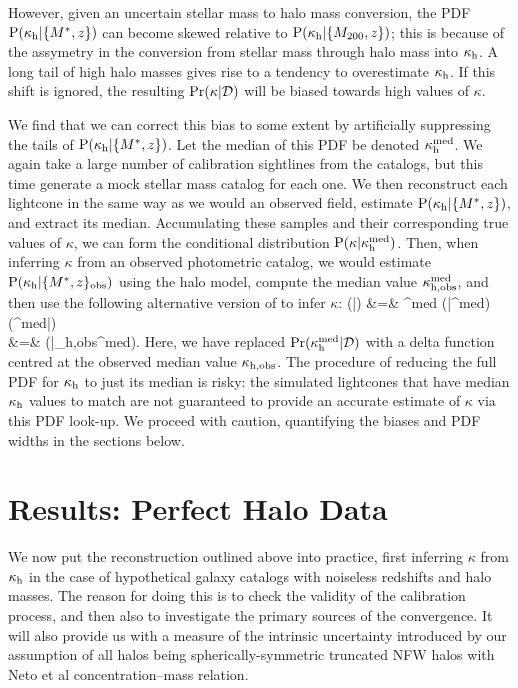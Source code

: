 \documentclass[useAMS,usenatbib]{mn2e}
\begin{document}
However, given an uncertain stellar mass to halo mass conversion, the PDF
${\rm P}(\kappa_{\rm h}|\{M^{*},z\})$ can become skewed relative to
${\rm P}(\kappa_{\rm h}|\{M_{200},z\})$; this is because of the assymetry in the
conversion from stellar mass through halo mass into $\kappa_{\rm h}$. A long tail of
high halo masses gives rise to a tendency to overestimate $\kappa_{\rm h}$.
If this shift is ignored, the resulting $\Pr(\kappa|{\mathcal{D}})$ will be 
biased towards high values of $\kappa$. 

We find that we can correct this bias to some extent by artificially 
suppressing the tails of ${\rm P}(\kappa_{\rm h}|\{M^{*},z\})$. Let the median of
this PDF be denoted $\kappa_{\rm h}^{\rm med}$. We again take a large number of
calibration sightlines from the \MS catalogs, but this time generate a mock
stellar mass catalog for each one. We then reconstruct each lightcone in the
same way as we would an observed field,
estimate ${\rm P}(\kappa_{\rm h}|\{M^{*},z\})$, and extract its median. Accumulating
these samples and their corresponding true values of $\kappa$, we can form the 
conditional distribution ${\rm P}(\kappa|\kappa_{\rm h}^{\rm med})$. 
Then, when inferring $\kappa$ from an observed photometric catalog, we would
estimate ${\rm P}(\kappa_{\rm h}|\{M^{*},z\}_{\rm obs})$ 
using the halo model, compute the median value 
$\kappa_{\rm h,obs}^{\rm med}$, and then use the following alternative
version of 
 to infer $\kappa$: 
\bea
\Pr(\kappa|) &=& \int \dee\kappah^{\rm med} 
   \Pr(\kappa|\kappah^{\rm med}) \Pr(\kappah^{\rm med}|) \notag \\
                        &=& \Pr(\kappa|\kappa_{\rm h,obs}^{\rm med}).
\label{eq:calkappaconv}   
\eea
Here, we have replaced $\Pr(\kappa_{\rm h}^{\rm med}|\mathcal{D})$ with a delta
function centred at the observed median value $\kappa_{\rm h,obs}$. 
The procedure of reducing the full PDF for $\kappa_{\rm h}$ to just its median is
risky: the simulated lightcones that have median $\kappa_{\rm h}$ values to match are
not guaranteed to provide an accurate estimate of $\kappa$ via this PDF
look-up. We proceed with caution, quantifying the biases and PDF widths in the
sections below.



\section{Results: Perfect Halo Data}
\label{sec:knownMh+z} 

We now put the reconstruction \proceedure outlined above into practice, first
inferring $\kappa$ from $\kappa_{\rm h}$ in the case of hypothetical galaxy catalogs
with noiseless redshifts and halo masses. The reason for doing this is to
check the validity of the calibration process, and then also to  investigate
the primary sources of the convergence. It will also provide us with a measure
of the intrinsic uncertainty introduced by our assumption of all halos being
spherically-symmetric truncated NFW halos with Neto et al concentration--mass
relation.
\end{document}
